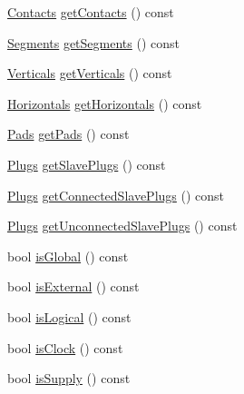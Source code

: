 \begin{DoxyCompactItemize}
\item 
\mbox{\hyperlink{namespaceHurricane_a1e6a8ab09f688509bd727b3fee02d0d2}{Contacts}} \mbox{\hyperlink{classHurricane_1_1Net_a9c397596fe9ecbf674712c72e0b9010c}{get\+Contacts}} () const
\item 
\mbox{\hyperlink{namespaceHurricane_a30748fa53a81cb597d4a13d651238716}{Segments}} \mbox{\hyperlink{classHurricane_1_1Net_aadc5a9ef26d7a72f49fdf22452f3cc58}{get\+Segments}} () const
\item 
\mbox{\hyperlink{namespaceHurricane_a146e2d3d34b4035aff422f12e85345b9}{Verticals}} \mbox{\hyperlink{classHurricane_1_1Net_a97f32cf738af9cf107833ca81fe95db8}{get\+Verticals}} () const
\item 
\mbox{\hyperlink{namespaceHurricane_a721e644c7d97f2f66049ab062140b855}{Horizontals}} \mbox{\hyperlink{classHurricane_1_1Net_ad8553af888909e1c127e12e68bd000fb}{get\+Horizontals}} () const
\item 
\mbox{\hyperlink{namespaceHurricane_abd1f433c44d8b515e1b8a8810aea1610}{Pads}} \mbox{\hyperlink{classHurricane_1_1Net_a564df07be5589bc72dd6eb944855aa2b}{get\+Pads}} () const
\item 
\mbox{\hyperlink{namespaceHurricane_ac8335d2057483ee7a935c15a9460c64f}{Plugs}} \mbox{\hyperlink{classHurricane_1_1Net_a9c835d2f071155521700921d816ac1fa}{get\+Slave\+Plugs}} () const
\item 
\mbox{\hyperlink{namespaceHurricane_ac8335d2057483ee7a935c15a9460c64f}{Plugs}} \mbox{\hyperlink{classHurricane_1_1Net_a08560ffa6b0f5ecc442bf232486dd8ff}{get\+Connected\+Slave\+Plugs}} () const
\item 
\mbox{\hyperlink{namespaceHurricane_ac8335d2057483ee7a935c15a9460c64f}{Plugs}} \mbox{\hyperlink{classHurricane_1_1Net_aad3f3ea88bdea914cab3f38bdcdb843d}{get\+Unconnected\+Slave\+Plugs}} () const
\item 
bool \mbox{\hyperlink{classHurricane_1_1Net_a332e9b311809f75fc0fa3a5f36acebcc}{is\+Global}} () const
\item 
bool \mbox{\hyperlink{classHurricane_1_1Net_aeeb3735dd7451bc0054dd68ac21aae47}{is\+External}} () const
\item 
bool \mbox{\hyperlink{classHurricane_1_1Net_a9caf25bfa84478157d206979dd521ed4}{is\+Logical}} () const
\item 
bool \mbox{\hyperlink{classHurricane_1_1Net_a8807cc000bbbe1c340c71fcbfbb8fe33}{is\+Clock}} () const
\item 
bool \mbox{\hyperlink{classHurricane_1_1Net_ab8947fc6c5093341958b94148407c2a2}{is\+Supply}} () const
\item 

\end{DoxyCompactItemize}

